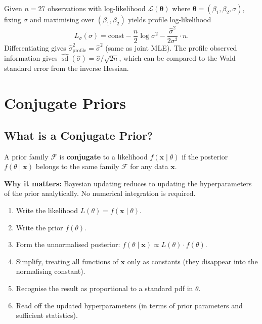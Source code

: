 \documentclass[11pt, a4paper]{article}
\newcommand{\calL}{\mathcal{L}}
\begin{document}
\begin{exbox}
Given $n = 27$ observations with log-likelihood $\calL(\boldsymbol\theta)$ where $\boldsymbol\theta = (\beta_1, \beta_2, \sigma)$, fixing $\sigma$ and maximising over $(\beta_1, \beta_2)$ yields profile log-likelihood
\[
  L_\sigma(\sigma) = \text{const} - \frac{n}{2}\log\sigma^2 - \frac{\hat{\sigma}^2}{2\sigma^2}\cdot n.
\]
Differentiating gives $\hat{\sigma}^2_\text{profile} = \hat{\sigma}^2$ (same as joint MLE). The profile observed information gives $\widehat{\operatorname{sd}}(\hat{\sigma}) = \hat{\sigma}/\sqrt{2n}$, which can be compared to the Wald standard error from the inverse Hessian.
\end{exbox}

\newpage
\section{Conjugate Priors}

\subsection*{What is a Conjugate Prior?}

\begin{defbox}
A prior family $\mathcal{F}$ is \textbf{conjugate} to a likelihood $f(\mathbf{x} \mid \theta)$ if the posterior $f(\theta \mid \mathbf{x})$ belongs to the same family $\mathcal{F}$ for any data $\mathbf{x}$.

\medskip
\textbf{Why it matters:} Bayesian updating reduces to updating the hyperparameters of the prior analytically. No numerical integration is required.
\end{defbox}

\begin{methodbox}
\begin{enumerate}
  \item Write the likelihood $L(\theta) = f(\mathbf{x} \mid \theta)$.
  \item Write the prior $f(\theta)$.
  \item Form the unnormalised posterior: $f(\theta \mid \mathbf{x}) \propto L(\theta) \cdot f(\theta)$.
  \item Simplify, treating all functions of $\mathbf{x}$ only as constants (they disappear into the normalising constant).
  \item Recognise the result as proportional to a standard pdf in $\theta$.
  \item Read off the updated hyperparameters (in terms of prior parameters and sufficient statistics).
\end{enumerate}
\end{methodbox}
\end{document}
